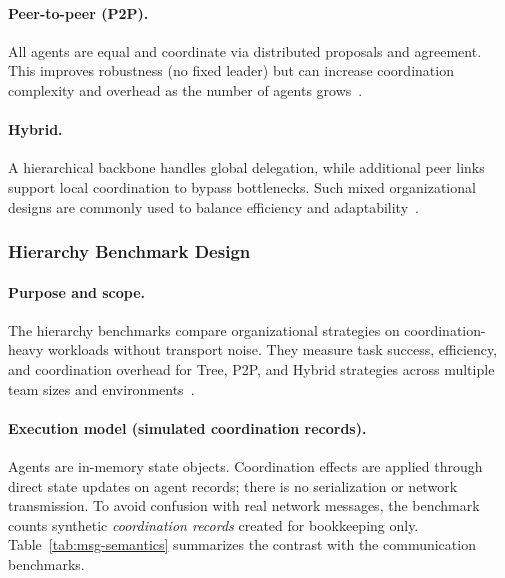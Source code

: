 \paragraph{Peer-to-peer (P2P).}
All agents are equal and coordinate via distributed proposals and agreement. This improves robustness (no fixed leader) but can increase coordination complexity and overhead as the number of agents grows~\cite{Shehory1998Architectural,Eugster2003PubSubSurvey,Kempe2003Gossip}.

\paragraph{Hybrid.}
A hierarchical backbone handles global delegation, while additional peer links support local coordination to bypass bottlenecks. Such mixed organizational designs are commonly used to balance efficiency and adaptability~\cite{Dignum2004AgentOrganizations,Wooldridge2009MAS}.

\subsubsection{Hierarchy Benchmark Design}
\paragraph{Purpose and scope.}
The hierarchy benchmarks compare organizational strategies on coordination-heavy workloads without transport noise. They measure task success, efficiency, and coordination overhead for Tree, P2P, and Hybrid strategies across multiple team sizes and environments~\cite{Wooldridge2009MAS,VanSteenTanenbaum2017DistributedSystems,Dignum2004AgentOrganizations}.

\paragraph{Execution model (simulated coordination records).}
Agents are in-memory state objects. Coordination effects are applied through direct state updates on agent records; there is no serialization or network transmission. To avoid confusion with real network messages, the benchmark counts synthetic \emph{coordination records} created for bookkeeping only. Table~\ref{tab:msg-semantics} summarizes the contrast with the communication benchmarks.

